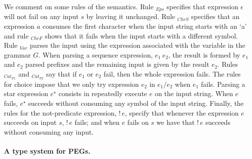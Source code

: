 \documentclass[sigplan,screen]{acmart}
\theoremstyle{definition}
\begin{document}
We comment on some rules of the semantics. Rule $_{Eps}$ specifies that
expression $\epsilon$ will not fail on any input $s$ by leaving it unchanged.
Rule $_{ChrS}$ specifies that an expression $a$ consumes the first character when
the input string starts with an `a' and rule $_{ChrF}$ shows that it fails when
the input starts with a different symbol. Rule $_{Var}$ parses the input using
the expression associated with the variable in the grammar $G$. When parsing a
sequence expression, $e_1\:e_2$, the result is formed by $e_1$ and $e_2$ parsed
prefixes and the remaining input is given by the result $e_2$. Rules $_{Cat_{F1}}$ and
$_{Cat_{F2}}$ say that if $e_1$ or $e_2$ fail, then the whole expression fails.
The rules for choice impose that we only try
expression $e_2$ in $e_1 / e_2$ when $e_1$ fails. Parsing a star
expression $e^\star$ consists in repeatedly execute $e$ on the input string.
When $e$ fails, $e^\star$ succeeds without consuming any symbol of the input
string. Finally, the rules for the not-predicate expression, $!\,e$, specify
that whenever the expression $e$ succeeds on input $s$, $!\,e$ fails; and when $e$
fails on $s$ we have that $!\,e$ succeeds without consuming any input.

\paragraph{A type system for PEGs.}
\end{document}
